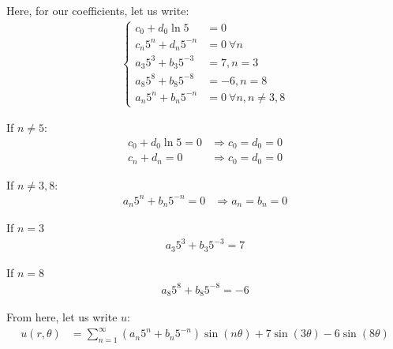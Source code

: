 \documentclass{article}
\begin{document}
\begin{enumerate}
\begin{enumerate}
    Here, for our coefficients, let us write:
    \begin{align}
      \begin{cases}
        c_0 + d_0 \ln 5 & = 0\\
        c_n 5^n + d_n 5^{-n} & = 0\ \forall n\\
        a_3 5^3 + b_3 5^{-3} & = 7, n = 3\\
        a_8 5^8 + b_8 5^{-8} & = -6, n = 8\\
        a_n 5^n + b_n 5^{-n} & = 0\ \forall n, n \neq 3, 8
      \end{cases}
    \end{align}

    If $n \neq 5$:
    \begin{align}
      c_0 + d_0 \ln 5 = 0 & \Rightarrow c_0 = d_0 = 0\\
      c_n + d_n = 0 & \Rightarrow c_0 = d_0 = 0
    \end{align}

    If $n \neq 3, 8$:
    \begin{align}
      a_n 5^n + b_n 5^{-n} = 0 & \Rightarrow a_n = b_n = 0
    \end{align}

    If $n = 3$
    \begin{align}
      a_3 5^3 + b_3 5^{-3} = 7
    \end{align}

    If $n = 8$
    \begin{align}
      a_8 5^8 + b_8 5^{-8} = -6
    \end{align}

    From here, let us write $u$:
    \begin{align}
      u(r, \theta) & = \sum^\infty_{n = 1}
      (a_n 5^n + b_n 5^{-n}) \sin(n \theta) +
      7 \sin(3 \theta) - 6 \sin(8 \theta)
    \end{align}
  \end{enumerate}
\end{enumerate}
\end{document}
